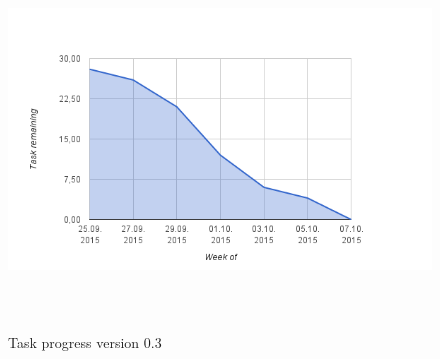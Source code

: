 \begin{figure}
\centering
\includegraphics[height=10cm]{figs/v03/progress3.png}
\caption{Task progress version 0.3}
\label{fig:progress-3}
\end{figure}


